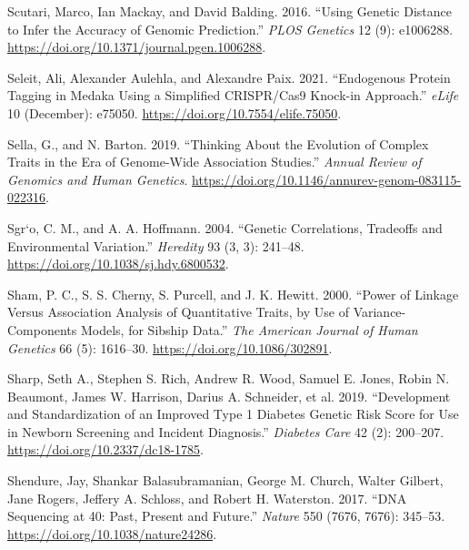 \documentclass[
]{book}
\newlength{\cslhangindent}
\newlength{\cslentryspacingunit} %
\newenvironment{CSLReferences}[2] %
 {%
  \setlength{\parindent}{0pt}
  \ifodd #1
  \let\oldpar\par
  \def\par{\hangindent=\cslhangindent\oldpar}
  \fi
  \setlength{\parskip}{#2\cslentryspacingunit}
 }%
 {}
\begin{document}
\begin{CSLReferences}{1}{0}
\leavevmode{}%
Scutari, Marco, Ian Mackay, and David Balding. 2016. {``Using {Genetic Distance} to {Infer} the {Accuracy} of {Genomic Prediction}.''} \emph{PLOS Genetics} 12 (9): e1006288. \url{https://doi.org/10.1371/journal.pgen.1006288}.

\leavevmode{}%
Seleit, Ali, Alexander Aulehla, and Alexandre Paix. 2021. {``Endogenous Protein Tagging in Medaka Using a Simplified {CRISPR}/{Cas9} Knock-in Approach.''} \emph{eLife} 10 (December): e75050. \url{https://doi.org/10.7554/elife.75050}.

\leavevmode{}%
Sella, G., and N. Barton. 2019. {``Thinking {About} the {Evolution} of {Complex Traits} in the {Era} of {Genome-Wide Association Studies}.''} \emph{Annual Review of Genomics and Human Genetics}. \url{https://doi.org/10.1146/annurev-genom-083115-022316}.

\leavevmode{}%
Sgr`o, C. M., and A. A. Hoffmann. 2004. {``Genetic Correlations, Tradeoffs and Environmental Variation.''} \emph{Heredity} 93 (3, 3): 241--48. \url{https://doi.org/10.1038/sj.hdy.6800532}.

\leavevmode{}%
Sham, P. C., S. S. Cherny, S. Purcell, and J. K. Hewitt. 2000. {``Power of {Linkage} Versus {Association Analysis} of {Quantitative Traits}, by {Use} of {Variance-Components Models}, for {Sibship Data}.''} \emph{The American Journal of Human Genetics} 66 (5): 1616--30. \url{https://doi.org/10.1086/302891}.

\leavevmode{}%
Sharp, Seth A., Stephen S. Rich, Andrew R. Wood, Samuel E. Jones, Robin N. Beaumont, James W. Harrison, Darius A. Schneider, et al. 2019. {``Development and {Standardization} of an {Improved Type} 1 {Diabetes Genetic Risk Score} for {Use} in {Newborn Screening} and {Incident Diagnosis}.''} \emph{Diabetes Care} 42 (2): 200--207. \url{https://doi.org/10.2337/dc18-1785}.

\leavevmode{}%
Shendure, Jay, Shankar Balasubramanian, George M. Church, Walter Gilbert, Jane Rogers, Jeffery A. Schloss, and Robert H. Waterston. 2017. {``{DNA} Sequencing at 40: Past, Present and Future.''} \emph{Nature} 550 (7676, 7676): 345--53. \url{https://doi.org/10.1038/nature24286}.


\end{CSLReferences}
\end{document}
